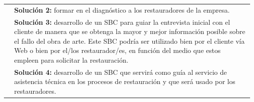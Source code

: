 \documentclass[a4paper,11pt]{article}
\begin{document}
\begin{center}
\begin{tabular}{| p{2.9cm} | p{8.5cm} |}
					\cellcolor[RGB]{224,233,250}& \textbf{Solución 2:} formar en el diagnóstico
					a los restauradores de la empresa.\\
					\cellcolor[RGB]{224,233,250}& \textbf{Solución 3:} desarrollo de un SBC
					para guiar la entrevista inicial con el cliente de manera que se obtenga la mayor y mejor información posible sobre el fallo del obra de arte. Este SBC podría ser utilizado bien por el cliente vía Web o bien por el/los restaurador/es, en función del medio que estos empleen para solicitar la restauración.\\
					\cellcolor[RGB]{224,233,250}& \textbf{Solución 4:} desarrollo de un SBC que
					servirá como guía al servicio de asistencia técnica en los procesos de restauración y que será usado por los restauradores.\\
					\hline
				\end{tabular}
			\end{center}
			\newpage
\end{document}
